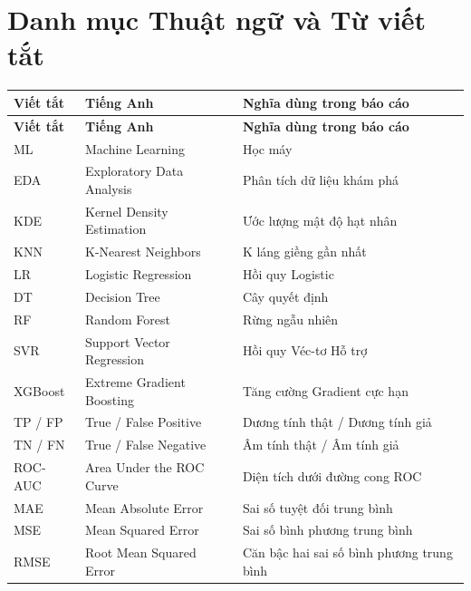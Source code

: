 \chapter*{Danh mục Thuật ngữ và Từ viết tắt}

\begin{longtable}{@{}L{2.4cm}L{5.0cm}L{6.4cm}@{}}
\toprule
\textbf{Viết tắt} & \textbf{Tiếng Anh} & \textbf{Nghĩa dùng trong báo cáo} \\
\midrule
\endfirsthead
\toprule
\textbf{Viết tắt} & \textbf{Tiếng Anh} & \textbf{Nghĩa dùng trong báo cáo} \\
\midrule
\endhead
\bottomrule
\endfoot
ML        & Machine Learning              & Học máy \\
EDA       & Exploratory Data Analysis     & Phân tích dữ liệu khám phá \\
KDE       & Kernel Density Estimation     & Ước lượng mật độ hạt nhân \\
KNN       & K-Nearest Neighbors           & K láng giềng gần nhất \\
LR        & Logistic Regression           & Hồi quy Logistic \\
DT        & Decision Tree                 & Cây quyết định \\
RF        & Random Forest                 & Rừng ngẫu nhiên \\
SVR       & Support Vector Regression     & Hồi quy Véc-tơ Hỗ trợ \\
XGBoost   & Extreme Gradient Boosting     & Tăng cường Gradient cực hạn \\
TP / FP   & True / False Positive         & Dương tính thật / Dương tính giả \\
TN / FN   & True / False Negative         & Âm tính thật / Âm tính giả \\
ROC-AUC   & Area Under the ROC Curve      & Diện tích dưới đường cong ROC \\
MAE       & Mean Absolute Error           & Sai số tuyệt đối trung bình \\
MSE       & Mean Squared Error            & Sai số bình phương trung bình \\
RMSE      & Root Mean Squared Error       & Căn bậc hai sai số bình phương trung bình \\

\end{longtable}
